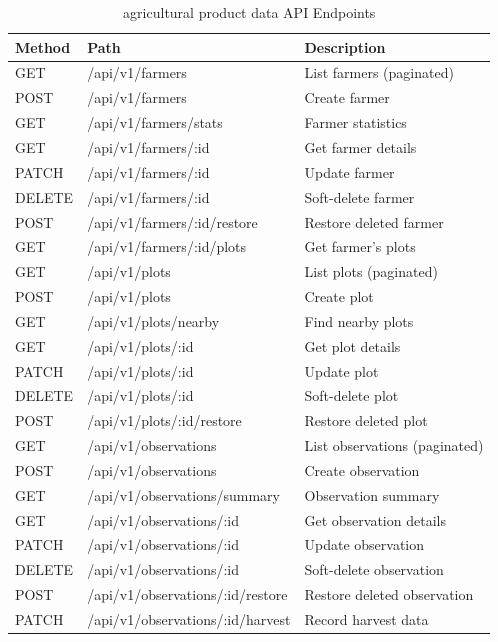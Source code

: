 \begin{longtable}{lll}
\caption{agricultural product data API Endpoints}
\label{tab:data-api} \\
\toprule
\textbf{Method} & \textbf{Path} & \textbf{Description} \\
\midrule
\endhead
\midrule
\endfoot
\bottomrule
\endlastfoot
GET & /api/v1/farmers & List farmers (paginated) \\
POST & /api/v1/farmers & Create farmer \\
GET & /api/v1/farmers/stats & Farmer statistics \\
GET & /api/v1/farmers/:id & Get farmer details \\
PATCH & /api/v1/farmers/:id & Update farmer \\
DELETE & /api/v1/farmers/:id & Soft-delete farmer \\
POST & /api/v1/farmers/:id/restore & Restore deleted farmer \\
GET & /api/v1/farmers/:id/plots & Get farmer's plots \\
GET & /api/v1/plots & List plots (paginated) \\
POST & /api/v1/plots & Create plot \\
GET & /api/v1/plots/nearby & Find nearby plots \\
GET & /api/v1/plots/:id & Get plot details \\
PATCH & /api/v1/plots/:id & Update plot \\
DELETE & /api/v1/plots/:id & Soft-delete plot \\
POST & /api/v1/plots/:id/restore & Restore deleted plot \\
GET & /api/v1/observations & List observations (paginated) \\
POST & /api/v1/observations & Create observation \\
GET & /api/v1/observations/summary & Observation summary \\
GET & /api/v1/observations/:id & Get observation details \\
PATCH & /api/v1/observations/:id & Update observation \\
DELETE & /api/v1/observations/:id & Soft-delete observation \\
POST & /api/v1/observations/:id/restore & Restore deleted observation \\
PATCH & /api/v1/observations/:id/harvest & Record harvest data \\
\end{longtable}

